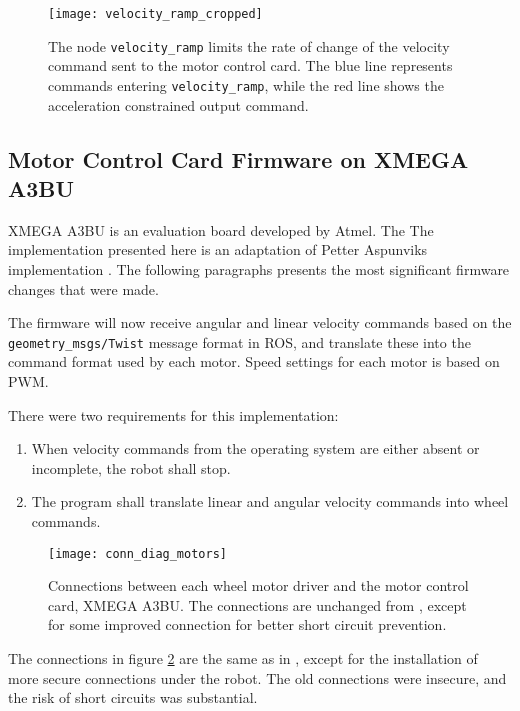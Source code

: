 \begin{figure}[h]
	\centering
	\texttt{[image: velocity\_ramp\_cropped]}
	\caption{The node \texttt{velocity\_ramp} limits the rate of change of the velocity command sent to the motor control card. The blue line represents commands entering \texttt{velocity\_ramp}, while the red line shows the acceleration constrained output command.}
	\label{fig:velocity_ramp}
\end{figure}

\subsection{Motor Control Card Firmware on XMEGA A3BU}

XMEGA A3BU is an evaluation board developed by Atmel. The The implementation presented here is an adaptation of Petter Aspunviks implementation \cite{aspunvik}. The following paragraphs presents the most significant firmware changes that were made.

The firmware will now receive angular and linear velocity commands based on the \texttt{geometry\_msgs/Twist} message format in \ac{ROS}, and translate these into the command format used by each motor. Speed settings for each motor is based on \ac{PWM}. 

There were two requirements for this implementation: 
\begin{enumerate}
\item When velocity commands from the operating system are either absent or incomplete, the robot shall stop.
\item The program shall translate linear and angular velocity commands into wheel commands.
\end{enumerate}

\begin{figure}[h]
	\centering
	\texttt{[image: conn\_diag\_motors]}
	\caption{Connections between each wheel motor driver and the motor control card, XMEGA A3BU. The connections are unchanged from \cite{aspunvik}, except for some improved connection for better short circuit prevention.}
	\label{fig:conn_diag_motors}
\end{figure}

The connections in figure \ref{fig:conn_diag_motors} are the same as in \cite{aspunvik}, except for the installation of more secure connections under the robot. The old connections were insecure, and the risk of short circuits was substantial.


